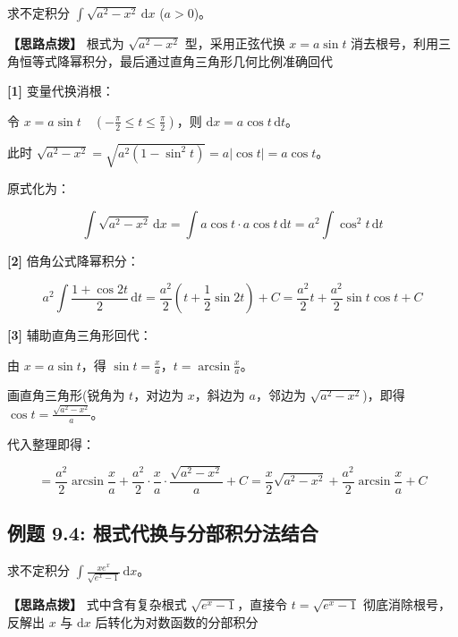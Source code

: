 \documentclass[11pt,a4paper,UTF8]{ctexart}
\begin{document}
求不定积分 $\int \sqrt{a^2-x^2}\,\mathrm{d}x$ ($a > 0$)。

\textbf{\color{DeepPurple}【思路点拨】} 根式为 $\sqrt{a^2-x^2}$ 型，采用正弦代换 $x = a\sin t$ 消去根号，利用三角恒等式降幂积分，最后通过直角三角形几何比例准确回代


\begin{solbox}[分步推导与答题规范]
\textbf{[1]} 变量代换消根：

令 $x = a\sin t \quad \left(-\frac{\pi}{2} \leqslant t \leqslant \frac{\pi}{2}\right)$，则 $\mathrm{d}x = a\cos t\,\mathrm{d}t$。

此时 $\sqrt{a^2-x^2} = \sqrt{a^2(1-\sin^2 t)} = a|\cos t| = a\cos t$。

原式化为：


\begin{equation*}
\int \sqrt{a^2-x^2}\,\mathrm{d}x = \int a\cos t \cdot a\cos t\,\mathrm{d}t = a^2 \int \cos^2 t\,\mathrm{d}t
\end{equation*}


\textbf{[2]} 倍角公式降幂积分：


\begin{equation*}
a^2 \int \frac{1+\cos 2t}{2}\,\mathrm{d}t = \frac{a^2}{2}\left(t + \frac{1}{2}\sin 2t\right) + C = \frac{a^2}{2}t + \frac{a^2}{2}\sin t\cos t + C
\end{equation*}


\textbf{[3]} 辅助直角三角形回代：

由 $x = a\sin t$，得 $\sin t = \frac{x}{a}$，$t = \arcsin\frac{x}{a}$。

画直角三角形(锐角为 $t$，对边为 $x$，斜边为 $a$，邻边为 $\sqrt{a^2-x^2}$)，即得 $\cos t = \frac{\sqrt{a^2-x^2}}{a}$。

代入整理即得：


\begin{equation*}
= \frac{a^2}{2}\arcsin\frac{x}{a} + \frac{a^2}{2}\cdot \frac{x}{a}\cdot \frac{\sqrt{a^2-x^2}}{a} + C = \frac{x}{2}\sqrt{a^2-x^2} + \frac{a^2}{2}\arcsin\frac{x}{a} + C
\end{equation*}

\end{solbox}


\subsection{例题 9.4: 根式代换与分部积分法结合}

求不定积分 $\int \frac{xe^x}{\sqrt{e^x-1}}\,\mathrm{d}x$。

\textbf{\color{DeepPurple}【思路点拨】} 式中含有复杂根式 $\sqrt{e^x-1}$，直接令 $t = \sqrt{e^x-1}$ 彻底消除根号，反解出 $x$ 与 $\mathrm{d}x$ 后转化为对数函数的分部积分
\end{document}
